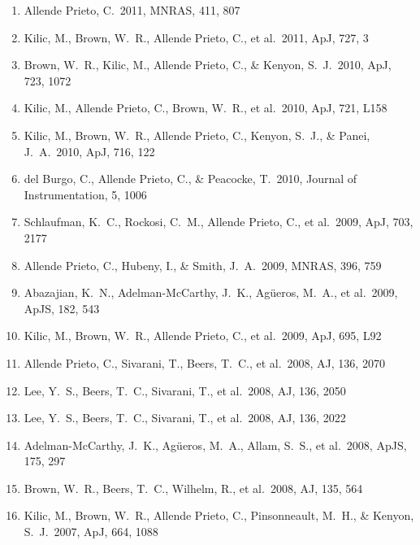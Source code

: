 \documentclass[12pt]{article}
\begin{document}
\begin{enumerate}
\item Allende Prieto, C.\ 
2011, MNRAS, 411, 807 


\item Kilic, M., Brown, W.~R., 
Allende Prieto, C., et al.\ 2011, ApJ, 727, 3 


\item Brown, W.~R., Kilic, M., 
Allende Prieto, C., \& Kenyon, S.~J.\ 2010, ApJ, 723, 1072 


\item Kilic, M., Allende 
Prieto, C., Brown, W.~R., et al.\ 2010, ApJ, 721, L158 


\item Kilic, M., Brown, W.~R., 
Allende Prieto, C., Kenyon, S.~J., \& Panei, J.~A.\ 2010, ApJ, 716, 122 


\item del Burgo, C., 
Allende Prieto, C., 
\& Peacocke, T.\ 2010, Journal of Instrumentation, 5, 1006 


\item Schlaufman, K.~C., 
Rockosi, C.~M., Allende Prieto, C., et al.\ 2009, ApJ, 703, 2177 


\item Allende Prieto, 
C., Hubeny, I., \& Smith, J.~A.\ 2009, MNRAS, 396, 759 


\item Abazajian, K.~N., 
Adelman-McCarthy, J.~K., Ag{\"u}eros, M.~A., et al.\ 2009, ApJS, 182, 543 


\item Kilic, M., Brown, W.~R., 
Allende Prieto, C., et al.\ 2009, ApJ, 695, L92 


\item Allende Prieto, 
C., Sivarani, T., Beers, T.~C., et al.\ 2008, AJ, 136, 2070 


\item Lee, Y.~S., Beers, T.~C., 
Sivarani, T., et al.\ 2008, AJ, 136, 2050 


\item Lee, Y.~S., Beers, T.~C., 
Sivarani, T., et al.\ 2008, AJ, 136, 2022 


\item 
Adelman-McCarthy, J.~K., Ag{\"u}eros, M.~A., Allam, S.~S., et al.\ 2008, 
ApJS, 175, 297 


\item Brown, W.~R., Beers, 
T.~C., Wilhelm, R., et al.\ 2008, AJ, 135, 564 


\item Kilic, M., Brown, W.~R., 
Allende Prieto, C., Pinsonneault, M.~H., 
\& Kenyon, S.~J.\ 2007, ApJ, 664, 1088 



\end{enumerate}
\end{document}
